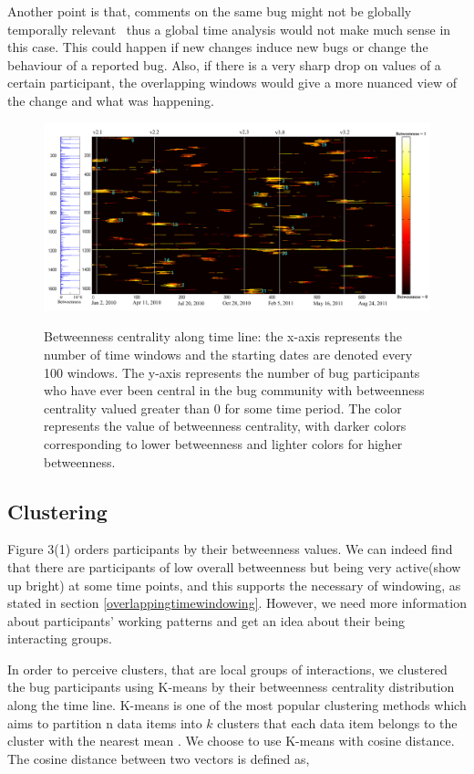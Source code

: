 \documentclass[conference]{IEEEtran}
\begin{document}
Another point is that, comments on the same bug might not be globally
temporally relevant~\cite{Springer:kidane,Procedia:ibaa} thus 
 a global time analysis would not make much sense in this case. This
 could happen if new changes induce new bugs or change the behaviour
 of a reported bug. Also, if there
is a very sharp drop on values of a certain participant, the
overlapping windows would give a more nuanced view of the change and
what was happening.


\begin{figure}[ht]
\centering
\includegraphics[width=18cm]{result.pdf}
\label{result}
\caption{Betweenness centrality along time line: the x-axis represents the
number of time windows and the starting dates are denoted every 100
windows. The y-axis represents the number of bug participants who have
ever been central in the bug community with betweenness
centrality valued greater than 0 for some time period. The
color represents the value of betweenness centrality, with darker
colors corresponding to lower betweenness and lighter colors for
higher betweenness. }
\end{figure}



\subsection{Clustering}
Figure 3(1) orders participants by their betweenness values. We can indeed find that there are participants of low overall betweenness but being very active(show up bright) at some time points, and this supports the necessary of windowing, as stated in section \ref{overlappingtimewindowing}. However, we need more information about participants' working patterns and get an idea about their being interacting groups. 

In order to perceive clusters, that are local groups of interactions,
we clustered the bug participants using K-means by their betweenness centrality
distribution along the time line.  
K-means is one of the most popular
clustering methods which aims to partition n data items into $k$ clusters that each data item belongs to the cluster with the nearest mean \cite{MATH:macqueen}. 
We choose to use K-means with cosine distance.
The
cosine distance between two vectors is defined as,
\end{document}
